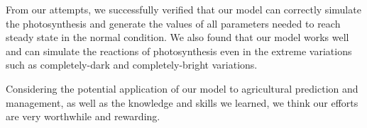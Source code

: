 \documentclass[12pt,reqno]{amsart}
\begin{document}
	From our attempts, we successfully verified that our model can correctly simulate the photosynthesis and generate the values of all parameters needed to reach steady state in the normal condition. We also found that our model works well and can simulate the reactions of photosynthesis even in the extreme variations such as completely-dark and completely-bright variations.
	
	Considering the potential application of our model to agricultural 
	prediction and management, as well as the knowledge and skills we 
	learned, we think our efforts are very worthwhile and rewarding.
	\nocite{*}
	\printbibliography	
	
	\newpage
	
	
	
\end{document}

